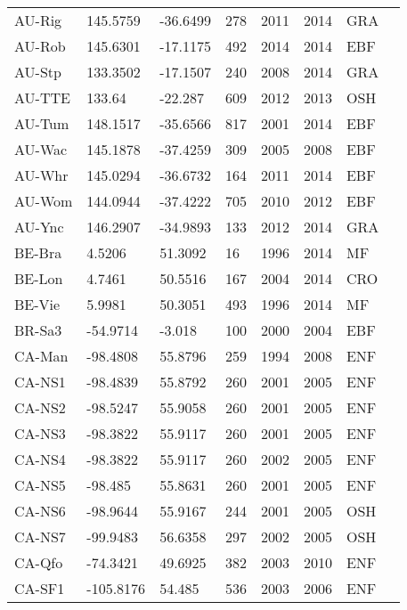 \documentclass[a4paper, 12pt]{article}
\begin{document}
\begin{longtable}{l l l l l l l l}
AU-Rig & 145.5759 & -36.6499 & 278 & 2011 & 2014 & GRA & \cite{AU-Rig} \\ 
AU-Rob & 145.6301 & -17.1175 & 492 & 2014 & 2014 & EBF & \cite{AU-Rob} \\ 
AU-Stp & 133.3502 & -17.1507 & 240 & 2008 & 2014 & GRA & \cite{AU-Stp} \\ 
AU-TTE & 133.64 & -22.287 & 609 & 2012 & 2013 & OSH & \cite{AU-TTE} \\ 
AU-Tum & 148.1517 & -35.6566 & 817 & 2001 & 2014 & EBF & \cite{AU-Tum} \\ 
AU-Wac & 145.1878 & -37.4259 & 309 & 2005 & 2008 & EBF & \cite{AU-Wac} \\ 
AU-Whr & 145.0294 & -36.6732 & 164 & 2011 & 2014 & EBF & \cite{AU-Whr} \\ 
AU-Wom & 144.0944 & -37.4222 & 705 & 2010 & 2012 & EBF & \cite{AU-Wom} \\ 
AU-Ync & 146.2907 & -34.9893 & 133 & 2012 & 2014 & GRA & \cite{AU-Ync} \\ 
BE-Bra & 4.5206 & 51.3092 & 16 & 1996 & 2014 & MF & \cite{BE-Bra} \\ 
BE-Lon & 4.7461 & 50.5516 & 167 & 2004 & 2014 & CRO & \cite{BE-Lon} \\ 
BE-Vie & 5.9981 & 50.3051 & 493 & 1996 & 2014 & MF & \cite{BE-Vie} \\ 
BR-Sa3 & -54.9714 & -3.018 & 100 & 2000 & 2004 & EBF & \cite{BR-Sa3} \\ 
CA-Man & -98.4808 & 55.8796 & 259 & 1994 & 2008 & ENF & \cite{CA-Man} \\ 
CA-NS1 & -98.4839 & 55.8792 & 260 & 2001 & 2005 & ENF & \cite{CA-NS1} \\ 
CA-NS2 & -98.5247 & 55.9058 & 260 & 2001 & 2005 & ENF & \cite{CA-NS2} \\ 
CA-NS3 & -98.3822 & 55.9117 & 260 & 2001 & 2005 & ENF & \cite{CA-NS3} \\ 
CA-NS4 & -98.3822 & 55.9117 & 260 & 2002 & 2005 & ENF & \cite{CA-NS4} \\ 
CA-NS5 & -98.485 & 55.8631 & 260 & 2001 & 2005 & ENF & \cite{CA-NS5} \\ 
CA-NS6 & -98.9644 & 55.9167 & 244 & 2001 & 2005 & OSH & \cite{CA-NS6} \\ 
CA-NS7 & -99.9483 & 56.6358 & 297 & 2002 & 2005 & OSH & \cite{CA-NS7} \\ 
CA-Qfo & -74.3421 & 49.6925 & 382 & 2003 & 2010 & ENF & \cite{CA-Qfo} \\ 
CA-SF1 & -105.8176 & 54.485 & 536 & 2003 & 2006 & ENF & \cite{CA-SF1} \\ 

\end{longtable}
\end{document}
